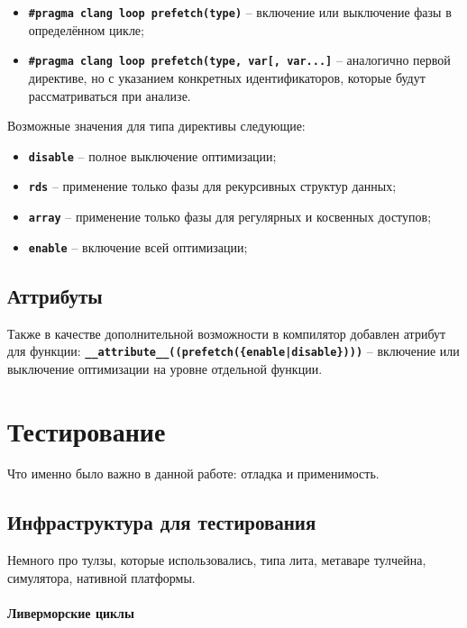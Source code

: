 \documentclass[12pt,a4paper]{article}
\begin{document}
\begin{itemize}
\item \texttt{\textbf{\#pragma clang loop prefetch(type)}} -- включение или выключение фазы в определённом цикле;
\item \texttt{\textbf{\#pragma clang loop prefetch(type, var[, var...]}} -- аналогично первой директиве, но с указанием конкретных идентификаторов, которые будут рассматриваться при анализе.
\end{itemize}

Возможные значения для типа директивы следующие:

\begin{itemize}
\item \texttt{\textbf{disable}} -- полное выключение оптимизации;
\item \texttt{\textbf{rds}} -- применение только фазы для рекурсивных структур данных;
\item \texttt{\textbf{array}} -- применение только фазы для регулярных и косвенных доступов;
\item \texttt{\textbf{enable}} -- включение всей оптимизации;
\end{itemize}

\subsection{Аттрибуты}

\indent

Также в качестве дополнительной возможности в компилятор добавлен атрибут для функции:\linebreak
\texttt{\textbf{\_\_attribute\_\_((prefetch(\{enable|disable\})))}} -- включение или выключение оптимизации на уровне отдельной функции.

\section{Тестирование}

Что именно было важно в данной работе: отладка и применимость.

\subsection{Инфраструктура для тестирования}

Немного про тулзы, которые использовались, типа лита, метаваре тулчейна, симулятора, нативной платформы.

\paragraph{Ливерморские циклы}
\end{document}
